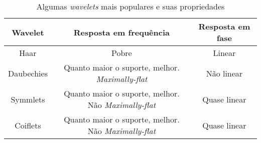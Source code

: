\begin{table}[h]
	\centering
	\begin{tabular}{|c|c|c|}
			\hline 
			\textbf{Wavelet} & \textbf{Resposta em frequência} & \textbf{Resposta em fase} \\ 
			\hline 
			Haar & Pobre &  Linear \\ 
			\hline 
			Daubechies & Quanto maior o suporte, melhor. \textit{Maximally-flat}  &  Não linear \\ 
			\hline 
			Symmlets & Quanto maior o suporte, melhor. Não \textit{Maximally-flat} & Quase linear \\ 
			\hline 
			Coiflets & Quanto maior o suporte, melhor. Não \textit{Maximally-flat} & Quase linear \\ 
			\hline 
	\end{tabular} 
	\caption{Algumas \textit{wavelets} mais populares e suas propriedades}
	\label{tab:waveletsProperties}
\end{table}